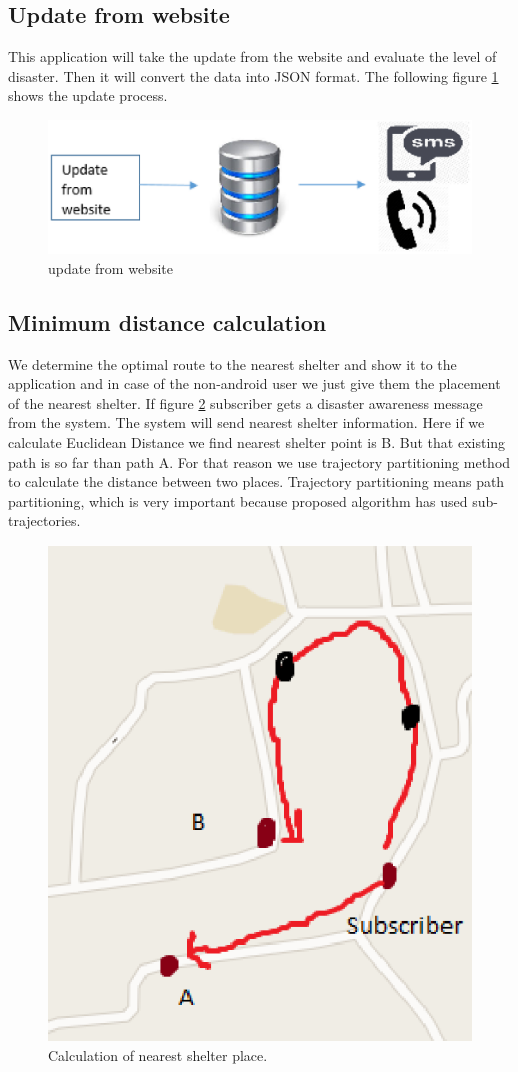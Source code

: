 \documentclass[conference]{IEEEtran}
\begin{document}
\subsection{Update from website}
This application will take the update from the website and evaluate the level of disaster. Then it will convert the data into JSON format. The following figure \ref{Figure:update} shows the update process.

\begin{figure}[htp]
	\centering
		\includegraphics[width=.45\textwidth]{fig/updatefrm.eps}
	\caption{ update from website }
	\label{Figure:update}
\end{figure}


\subsection{Minimum distance calculation}
We determine the optimal route to the nearest shelter and show it to the application and in case of the non-android user we just give them the placement of the nearest shelter. If figure \ref{Figure:optimal} subscriber gets a disaster awareness message from the system. The system will send nearest shelter information. Here if we calculate Euclidean Distance \cite{krislock2012euclidean} we find nearest shelter point is B. But that existing path is so far than path A. For that reason we use trajectory partitioning method\cite{lee2007trajectory} to calculate the distance between two places. Trajectory partitioning means path partitioning, which is very important because proposed algorithm has used sub-trajectories. 

\begin{figure}[htp]
	\centering
		\includegraphics[width=.35\textwidth]{fig/optimalp.eps}
	\caption{ Calculation of nearest shelter place. }
	\label{Figure:optimal}
\end{figure}
\end{document}
